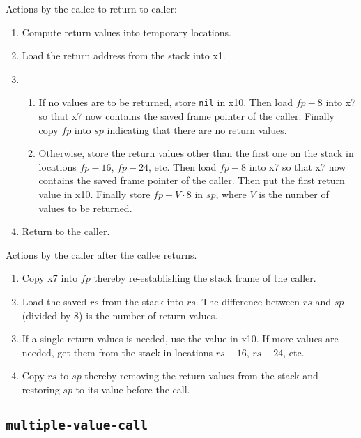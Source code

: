 Actions by the callee to return to caller:

\begin{enumerate}
\item Compute return values into temporary locations.
\item Load the return address from the stack into x1.
\item
  \begin{enumerate}
  \item If no values are to be returned, store \texttt{nil} in x10.
    Then load $fp - 8$ into x7 so that x7 now contains the saved frame
    pointer of the caller.  Finally copy $fp$ into $sp$ indicating
    that there are no return values.
  \item Otherwise, store the return values other than the first one on
    the stack in locations $fp - 16$, $fp - 24$, etc.  Then load $fp -
    8$ into x7 so that x7 now contains the saved frame pointer of the
    caller.  Then put the first return value in x10.  Finally store
    $fp - V \cdot 8$ in $sp$, where $V$ is the number of values to be
    returned.
  \end{enumerate}
\item Return to the caller.
\end{enumerate}

Actions by the caller after the callee returns.

\begin{enumerate}
\item Copy x7 into $fp$ thereby re-establishing the stack frame of the
  caller.
\item Load the saved $rs$ from the stack into $rs$.  The difference
  between $rs$ and $sp$ (divided by 8) is the number of return
  values.
\item If a single return values is needed, use the value in x10.  If
  more values are needed, get them from the stack in locations $rs -
  16$, $rs-24$, etc.
\item Copy $rs$ to $sp$ thereby removing the return values from the
  stack and restoring $sp$ to its value before the call.
\end{enumerate}

\subsection{\texttt{multiple-value-call}}

